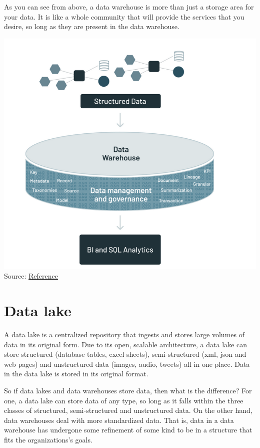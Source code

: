 \documentclass[
]{book}
\begin{document}
As you can see from above, a data warehouse is more than just a storage area for your data. It is like a whole community that will provide the services that you desire, so long as they are present in the data warehouse.

\includegraphics{./images/data_warehouse.png}
Source: \href{https://www.databricks.com/blog/2021/05/19/evolution-to-the-data-lakehouse.html}{Reference}

\hypertarget{data-lake}{%
\section{Data lake}\label{data-lake}}

A data lake is a centralized repository that ingests and stores large volumes of data in its original form. Due to its open, scalable architecture, a data lake can store structured (database tables, excel sheets), semi-structured (xml, json and web pages) and unstructured data (images, audio, tweets) all in one place. Data in the data lake is stored in its original format.

So if data lakes and data warehouses store data, then what is the difference? For one, a data lake can store data of any type, so long as it falls within the three classes of structured, semi-structured and unstructured data. On the other hand, data warehouses deal with more standardized data. That is, data in a data warehouse has undergone some refinement of some kind to be in a structure that fits the organizations's goals.
\end{document}
